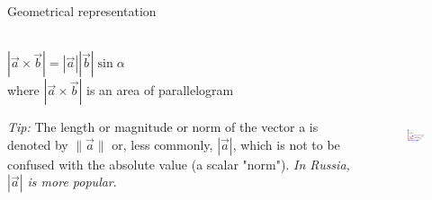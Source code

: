 \documentclass[aspectratio=169,notes]{beamer}
\begin{document}
\begin{frame}[t]{Geometrical representation}
\framesubtitle{}
\begin{columns}[T,onlytextwidth]
    \begin{column}{0.59\textwidth}
        $|\vec{a} \times \vec{b}| = |\vec{a}| |\vec{b}| \sin \alpha$ \\ 
        where $|\vec{a} \times \vec{b}|$ is an area of parallelogram \bigskip

        \textit{Tip:} The length or magnitude or norm of the vector a is denoted by $\|\vec{a}\|$ or, less commonly, $|\vec{a}|$, which is not to be confused with the absolute value (a scalar "norm"). \textit{In Russia, $|\vec{a}|$ is more popular}.
    \end{column}
    \begin{column}{0.39\textwidth}
        \begin{figure}[H]
            \centering\includegraphics[height=5cm,width=1\textwidth,keepaspectratio]{resources/image15.png}
            \label{fig:resources/image15.png}
        \end{figure}
    \end{column}
\end{columns}
\end{frame}
\end{document}
